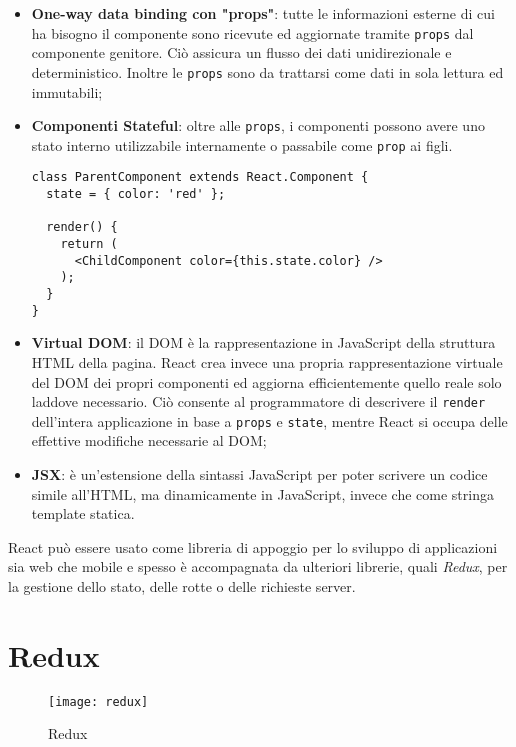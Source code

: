 \begin{itemize}
  \item \textbf{One-way data binding con "props"}: tutte le informazioni esterne di cui ha bisogno il componente sono ricevute ed aggiornate tramite \texttt{props} dal componente genitore. Ciò assicura un flusso dei dati unidirezionale e deterministico. Inoltre le \texttt{props} sono da trattarsi come dati in sola lettura ed immutabili;
  \item \textbf{Componenti Stateful}: oltre alle \texttt{props}, i componenti possono avere uno stato interno utilizzabile internamente o passabile come \texttt{prop} ai figli.

  \vfill

    \begin{lstlisting}[language={[Sharp]C}]
class ParentComponent extends React.Component {
  state = { color: 'red' };

  render() {
    return (
      <ChildComponent color={this.state.color} />
    );
  }
}
    \end{lstlisting}

  \item \textbf{Virtual DOM}: il DOM è la rappresentazione in JavaScript della struttura HTML della pagina. React crea invece una propria rappresentazione virtuale del DOM dei propri componenti ed aggiorna efficientemente quello reale solo laddove necessario. Ciò consente al programmatore di descrivere il \texttt{render} dell'intera applicazione in base a \texttt{props} e \texttt{state}, mentre React si occupa delle effettive modifiche necessarie al DOM;
  \item \textbf{JSX}: è un'estensione della sintassi JavaScript per poter scrivere un codice simile all'HTML, ma dinamicamente in JavaScript, invece che come stringa template statica.
\end{itemize}

React può essere usato come libreria di appoggio per lo sviluppo di applicazioni sia web che mobile e spesso è accompagnata da ulteriori librerie, quali \textit{Redux}, per la gestione dello stato, delle rotte o delle richieste server.

\section{Redux}

\begin{figure}[H] 
  \centering 
  \texttt{[image: redux]} 
  \caption{Redux}
\end{figure}

